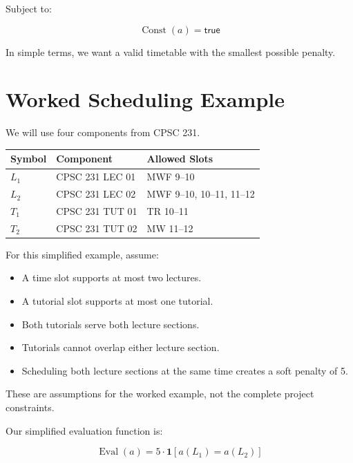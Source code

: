 \documentclass[11pt,letterpaper]{article}
\newcommand{\Const}{\operatorname{Const}}
\newcommand{\Eval}{\operatorname{Eval}}
\begin{document}
Subject to:

\begin{equation}
\boxed{\Const(a)=\mathsf{true}}
\end{equation}

In simple terms, we want a valid timetable
with the smallest possible penalty.

\section{Worked Scheduling Example}

We will use four components from CPSC 231.

\begin{tabularx}{\linewidth}{@{}llX@{}}
\toprule
\textbf{Symbol} & \textbf{Component} &
\textbf{Allowed Slots}\\
\midrule
$L_1$ & CPSC 231 LEC 01 &
MWF 9--10\\

$L_2$ & CPSC 231 LEC 02 &
MWF 9--10, 10--11, 11--12\\

$T_1$ & CPSC 231 TUT 01 &
TR 10--11\\

$T_2$ & CPSC 231 TUT 02 &
MW 11--12\\
\bottomrule
\end{tabularx}

For this simplified example, assume:

\begin{itemize}
    \item A time slot supports at most two lectures.
    \item A tutorial slot supports at most one tutorial.
    \item Both tutorials serve both lecture sections.
    \item Tutorials cannot overlap either lecture section.
    \item Scheduling both lecture sections at the same
    time creates a soft penalty of 5.
\end{itemize}

These are assumptions for the worked example,
not the complete project constraints.

Our simplified evaluation function is:

\begin{equation}
\boxed{
\Eval(a)=
5\cdot\mathbf{1}[a(L_1)=a(L_2)]
}
\end{equation}
\end{document}
